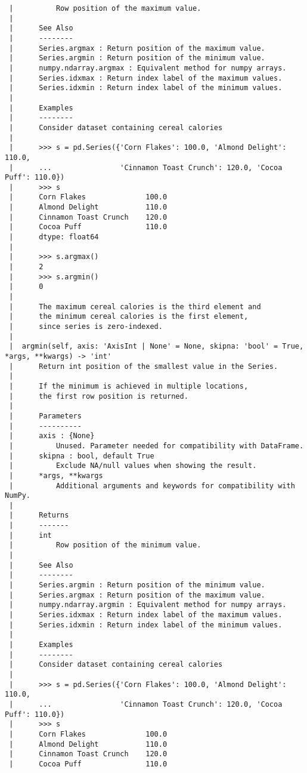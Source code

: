 \documentclass[
  letterpaper,
  DIV=11,
  numbers=noendperiod]{scrreprt}
\begin{document}
\begin{verbatim}
 |          Row position of the maximum value.
 |      
 |      See Also
 |      --------
 |      Series.argmax : Return position of the maximum value.
 |      Series.argmin : Return position of the minimum value.
 |      numpy.ndarray.argmax : Equivalent method for numpy arrays.
 |      Series.idxmax : Return index label of the maximum values.
 |      Series.idxmin : Return index label of the minimum values.
 |      
 |      Examples
 |      --------
 |      Consider dataset containing cereal calories
 |      
 |      >>> s = pd.Series({'Corn Flakes': 100.0, 'Almond Delight': 110.0,
 |      ...                'Cinnamon Toast Crunch': 120.0, 'Cocoa Puff': 110.0})
 |      >>> s
 |      Corn Flakes              100.0
 |      Almond Delight           110.0
 |      Cinnamon Toast Crunch    120.0
 |      Cocoa Puff               110.0
 |      dtype: float64
 |      
 |      >>> s.argmax()
 |      2
 |      >>> s.argmin()
 |      0
 |      
 |      The maximum cereal calories is the third element and
 |      the minimum cereal calories is the first element,
 |      since series is zero-indexed.
 |  
 |  argmin(self, axis: 'AxisInt | None' = None, skipna: 'bool' = True, *args, **kwargs) -> 'int'
 |      Return int position of the smallest value in the Series.
 |      
 |      If the minimum is achieved in multiple locations,
 |      the first row position is returned.
 |      
 |      Parameters
 |      ----------
 |      axis : {None}
 |          Unused. Parameter needed for compatibility with DataFrame.
 |      skipna : bool, default True
 |          Exclude NA/null values when showing the result.
 |      *args, **kwargs
 |          Additional arguments and keywords for compatibility with NumPy.
 |      
 |      Returns
 |      -------
 |      int
 |          Row position of the minimum value.
 |      
 |      See Also
 |      --------
 |      Series.argmin : Return position of the minimum value.
 |      Series.argmax : Return position of the maximum value.
 |      numpy.ndarray.argmin : Equivalent method for numpy arrays.
 |      Series.idxmax : Return index label of the maximum values.
 |      Series.idxmin : Return index label of the minimum values.
 |      
 |      Examples
 |      --------
 |      Consider dataset containing cereal calories
 |      
 |      >>> s = pd.Series({'Corn Flakes': 100.0, 'Almond Delight': 110.0,
 |      ...                'Cinnamon Toast Crunch': 120.0, 'Cocoa Puff': 110.0})
 |      >>> s
 |      Corn Flakes              100.0
 |      Almond Delight           110.0
 |      Cinnamon Toast Crunch    120.0
 |      Cocoa Puff               110.0

\end{verbatim}
\end{document}
